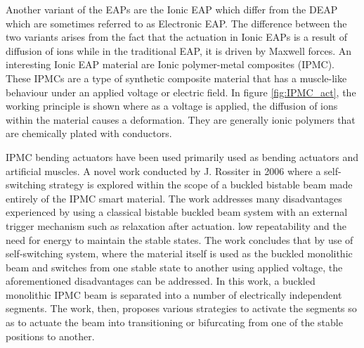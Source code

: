 Another variant of the EAPs are the Ionic EAP which differ from the DEAP which are sometimes referred to as Electronic EAP\cite{bar-cohen_artificial_2005}. The difference between the two variants arises from the fact that the actuation in Ionic EAPs is a result of diffusion of ions while in the traditional EAP, it is driven by Maxwell forces. An interesting Ionic EAP material are Ionic polymer-metal composites (IPMC). These IPMCs are a type of synthetic composite material that has a muscle-like behaviour under an applied voltage or electric field. In figure \ref{fig:IPMC_act}, the working principle is shown where as a voltage is applied, the diffusion of ions within the material causes a deformation. They are generally ionic polymers that are chemically plated with conductors\cite{shahinpoor_ionic_1998}.

IPMC bending actuators have been used primarily used as bending actuators and artificial muscles. A novel work conducted by J. Rossiter in 2006\cite{rossiter_self-switching_2006, rossiter_bistable_2006} where a self-switching strategy is explored within the scope of a buckled bistable beam made entirely of the IPMC smart material. The work addresses many disadvantages experienced by using a classical bistable buckled beam system with an external trigger mechanism such as relaxation after actuation. low repeatability and the need for energy to maintain the stable states. The work concludes that by use of self-switching system, where the material itself is used as the buckled monolithic beam and switches from one stable state to another using applied voltage, the aforementioned disadvantages can be addressed. In this work, a buckled monolithic IPMC beam is separated into a number of electrically independent segments. The work, then, proposes various strategies to activate the segments so as to actuate the beam into transitioning or bifurcating from one of the stable positions to another.
